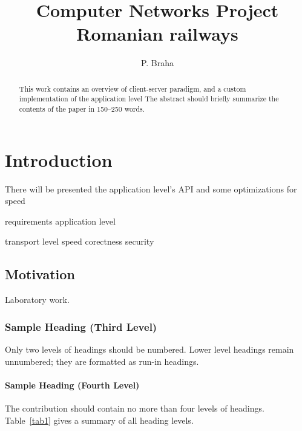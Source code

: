 \documentclass[runningheads]{llncs}
\begin{document}
\title{Computer Networks Project \\ Romanian railways}

\author{P. Braha}

\maketitle
%
\begin{abstract} This work contains an overview of client-server paradigm, and a custom implementation of the application level 
The abstract should briefly summarize the contents of the paper in
150--250 words.

\end{abstract}


\section{Introduction}

There will be presented the application level's API and some optimizations for speed

requirements
application level



transport level
speed 
corectness 
security

\subsection{Motivation}

Laboratory work. 

\subsubsection{Sample Heading (Third Level)} Only two levels of
headings should be numbered. Lower level headings remain unnumbered;
they are formatted as run-in headings.

\paragraph{Sample Heading (Fourth Level)}
The contribution should contain no more than four levels of
headings. Table~\ref{tab1} gives a summary of all heading levels.
\end{document}
